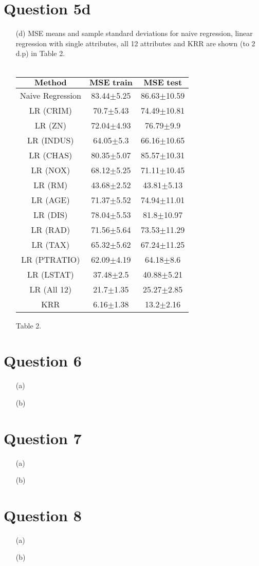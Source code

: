 \documentclass[a4paper,12pt]{article}
\begin{document}
\section*{Question 5d}
\begin{enumerate}

\item[(d)] 
MSE means and sample standard deviations for naive regression, linear regression with single attributes, all 12 attributes and KRR are shown (to 2 d.p) in Table 2.\\\\
\begin{tabular}{|c|c|c|}
\hline
$\textbf{Method}$&$\textbf{MSE train}$&$\textbf{MSE test}$\\
\hline
Naive Regression&83.44$\pm$5.25&86.63$\pm$10.59\\ \hline
LR (CRIM)&70.7$\pm$5.43&74.49$\pm$10.81\\ \hline
LR (ZN)&72.04$\pm$4.93&76.79$\pm$9.9\\ \hline
LR (INDUS)&64.05$\pm$5.3&66.16$\pm$10.65\\ \hline
LR (CHAS)&80.35$\pm$5.07&85.57$\pm$10.31\\ \hline
LR (NOX)&68.12$\pm$5.25&71.11$\pm$10.45\\ \hline
LR (RM)&43.68$\pm$2.52&43.81$\pm$5.13\\ \hline
LR (AGE)&71.37$\pm$5.52&74.94$\pm$11.01\\ \hline
LR (DIS)&78.04$\pm$5.53&81.8$\pm$10.97\\ \hline
LR (RAD)&71.56$\pm$5.64&73.53$\pm$11.29\\ \hline
LR (TAX)&65.32$\pm$5.62&67.24$\pm$11.25\\ \hline
LR (PTRATIO)&62.09$\pm$4.19&64.18$\pm$8.6\\ \hline
LR (LSTAT)&37.48$\pm$2.5&40.88$\pm$5.21\\ \hline
LR (All 12)&21.7$\pm$1.35&25.27$\pm$2.85\\ \hline
KRR&6.16$\pm$1.38&13.2$\pm$2.16\\
\hline
\end{tabular}\par 
Table 2.

\end{enumerate}
\clearpage
\section*{Question 6}
\begin{enumerate}
\item[(a)]
\item[(b)]
\end{enumerate}
\clearpage
\section*{Question 7}
\begin{enumerate}
\item[(a)]
\item[(b)] 
\end{enumerate}
\clearpage
\section*{Question 8}
\begin{enumerate}
\item[(a)]
\item[(b)] 
\end{enumerate}
\clearpage
\end{document}
